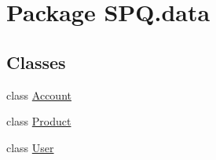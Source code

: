 \hypertarget{namespace_s_p_q_1_1data}{}\section{Package S\+P\+Q.\+data}
\label{namespace_s_p_q_1_1data}
\subsection*{Classes}
\begin{DoxyCompactItemize}
\item 
class \mbox{\hyperlink{class_s_p_q_1_1data_1_1_account}{Account}}
\item 
class \mbox{\hyperlink{class_s_p_q_1_1data_1_1_product}{Product}}
\item 
class \mbox{\hyperlink{class_s_p_q_1_1data_1_1_user}{User}}
\end{DoxyCompactItemize}
